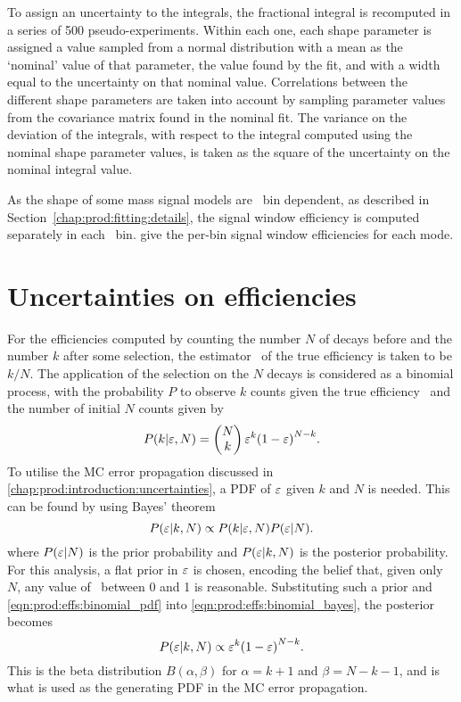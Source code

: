 To assign an uncertainty to the integrals, the fractional integral is
recomputed in a series of 500 pseudo-experiments.
Within each one, each shape parameter is assigned a value sampled from a
normal distribution with a mean as the `nominal' value of that parameter, the
value found by the fit, and with a width equal to the uncertainty on that
nominal value. Correlations between the different shape parameters are taken
into account by sampling parameter values from the covariance matrix found in
the nominal fit.
The variance on the deviation of the integrals, with respect to the integral
computed using the nominal shape parameter values, is taken as the square of
the uncertainty on the nominal integral value.

As the shape of some mass signal models are \pTy\ bin dependent, as described
in Section~\ref{chap:prod:fitting:details}, the signal window efficiency is computed
separately in each \pTy\ bin.
give the per-bin signal window efficiencies for each mode.

\section{Uncertainties on efficiencies}
\label{chap:prod:effs:tot}

For the efficiencies computed by counting the number $N$ of decays before and
the number $k$ after some selection, the estimator \effest\ of the true
efficiency is taken to be $k/N$.
The application of the selection on the $N$ decays is considered as a binomial
process, with the probability $P$ to observe $k$ counts given the true
efficiency \eff\ and the number of initial $N$ counts given by
\begin{equation}
  P(k | \varepsilon, N) = \begin{pmatrix}N\\k\end{pmatrix}\varepsilon^{k}{(1 - \varepsilon)}^{N - k}.
  \label{eqn:prod:effs:binomial_pdf}
\end{equation}
To utilise the \ac{MC} error propagation discussed in
\cref{chap:prod:introduction:uncertainties}, a \ac{PDF} of $\varepsilon$ given $k$ and
$N$ is needed.
This can be found by using Bayes' theorem
\begin{equation}
  P(\varepsilon | k, N) \propto P(k | \varepsilon, N)P(\varepsilon |N).
  \label{eqn:prod:effs:binomial_bayes}
\end{equation}
where $P(\varepsilon | N)$ is the prior probability and $P(\varepsilon | k, N)$ is the
posterior probability.
For this analysis, a flat prior in $\varepsilon$ is chosen, encoding the belief that,
given only $N$, any value of \eff\ between 0 and 1 is reasonable.
Substituting such a prior and \cref{eqn:prod:effs:binomial_pdf} into
\cref{eqn:prod:effs:binomial_bayes}, the posterior becomes
\begin{equation}
  P(\varepsilon | k, N) \propto \varepsilon^{k}{(1 - \varepsilon)}^{N - k}.
\end{equation}
This is the beta distribution $B(\alpha, \beta)$ for $\alpha = k + 1$ and
$\beta = N - k - 1$, and is what is used as the generating \ac{PDF} in the
\ac{MC} error propagation.

